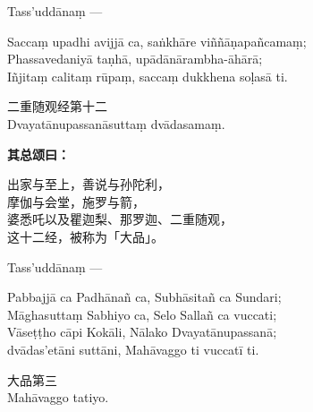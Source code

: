 Tass’uddānaṃ —

\begin{quoting}Saccaṃ upadhi avijjā ca, saṅkhāre viññāṇapañcamaṃ;\\
Phassavedaniyā taṇhā, upādānārambha-āhārā;\\
Iñjitaṃ calitaṃ rūpaṃ, saccaṃ dukkhena soḷasā ti.\end{quoting}

\begin{center}\vspace{1em}二重随观经第十二\\Dvayatānupassanāsuttaṃ dvādasamaṃ.\end{center}

\textbf{其总颂曰：}

\begin{quoting}出家与至上，善说与孙陀利，\\
摩伽与会堂，施罗与箭，\\
婆悉吒以及瞿迦梨、那罗迦、二重随观，\\
这十二经，被称为「大品」。\end{quoting}

Tass’uddānaṃ —

\begin{quoting}Pabbajjā ca Padhānañ ca, Subhāsitañ ca Sundari;\\
Māghasuttaṃ Sabhiyo ca, Selo Sallañ ca vuccati;\\
Vāseṭṭho cāpi Kokāli, Nālako Dvayatānupassanā;\\
dvādas’etāni suttāni, Mahāvaggo ti vuccatī ti.\end{quoting}

\begin{center}\vspace{1em}大品第三\\Mahāvaggo tatiyo.\end{center}